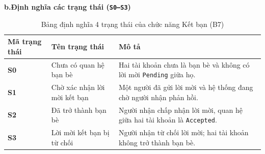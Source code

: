 \documentclass[11pt,a4paper]{article}
\begin{document}
\noindent\textbf{b.Định nghĩa các trạng thái (\texttt{S0--S3})}

\begin{table}[H]
\centering
\small
\begin{tabularx}{\textwidth}{|C{2.4cm}|L{4.8cm}|X|}
\hline
{}
\textbf{Mã trạng thái} & \textbf{Tên trạng thái} & \textbf{Mô tả} \tabularnewline
\hline
\textbf{S0} & Chưa có quan hệ bạn bè & Hai tài khoản chưa là bạn bè và không có lời mời \texttt{Pending} giữa họ. \\ \hline
\textbf{S1} & Chờ xác nhận lời mời kết bạn & Một người đã gửi lời mời và hệ thống đang chờ người nhận phản hồi. \\ \hline
\textbf{S2} & Đã trở thành bạn bè & Người nhận chấp nhận lời mời, quan hệ giữa hai tài khoản là \texttt{Accepted}. \\ \hline
\textbf{S3} & Lời mời kết bạn bị từ chối & Người nhận từ chối lời mời; hai tài khoản không trở thành bạn bè. \\ \hline
\end{tabularx}
\caption{Bảng định nghĩa 4 trạng thái của chức năng Kết bạn (B7)}
\end{table}

\pagebreak
\end{document}
